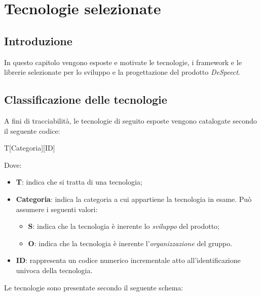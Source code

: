 \documentclass[./../Technology Baseline.tex]{subfiles}
\begin{document}
	
\chapter{Tecnologie selezionate}
	
\section{Introduzione}
In questo capitolo vengono esposte e motivate le tecnologie, i framework e le librerie selezionate per lo sviluppo e la progettazione del prodotto \textit{DeSpeect}.

\section{Classificazione delle tecnologie}

A fini di tracciabilità, le tecnologie di seguito esposte vengono catalogate secondo il seguente codice:

\begin{center}
	T[Categoria][ID]
\end{center}

Dove:

\begin{itemize}
	\item \textbf{T}: indica che si tratta di una tecnologia;
	\item \textbf{Categoria}: indica la categoria a cui appartiene la tecnologia in esame. Può assumere i seguenti valori:
		\begin{itemize}
			\item \textbf{S}: indica che la tecnologia è inerente lo \textit{sviluppo} del prodotto;
			\item \textbf{O}: indica che la tecnologia è inerente l'\textit{organizzazione} del gruppo.
		\end{itemize}
	\item \textbf{ID}: rappresenta un codice numerico incrementale atto all'identificazione univoca della tecnologia.
\end{itemize}

\noindent Le tecnologie sono presentate secondo il seguente schema: 
\end{document}
